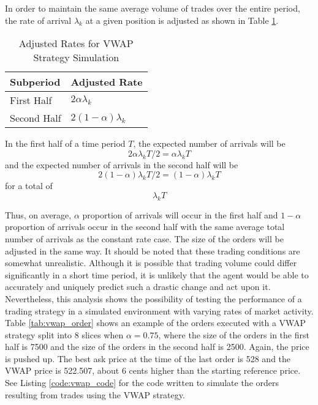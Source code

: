In order to maintain the same average volume of trades over the entire period, the rate of arrival $\lambda_k$ at a given position is adjusted as shown in Table \ref{tab:adjusted_rates}.

\begin{table}[htbp]
\caption{Adjusted Rates for VWAP Strategy Simulation} \label{tab:adjusted_rates}
\begin{center}
\begin{tabular}{l|l}
\textbf{Subperiod}            & \textbf{Adjusted Rate}             \\
\hline
First Half  & $2 \alpha \lambda_k $    \\
Second Half & $2 (1 - \alpha) \lambda_k$
\end{tabular}
\end{center}
\end{table}

In the first half of a time period $T$, the expected number of arrivals will be 
$$2 \alpha \lambda_k T / 2 = \alpha \lambda_k T$$ 
and the expected number of arrivals in the second half will be 
$$2 (1-\alpha) \lambda_k T / 2 = (1-\alpha) \lambda_k T$$
for a total of $$\lambda_k T$$

Thus, on average, $\alpha$ proportion of arrivals will occur in the first half and $1-\alpha$ proportion of arrivals occur in the second half with the same average total number of arrivals as the constant rate case. The size of the orders will be adjusted in the same way. It should be noted that these trading conditions are somewhat unrealistic. Although it is possible that trading volume could differ significantly in a short time period, it is unlikely that the agent would be able to accurately and uniquely predict such a drastic change and act upon it. Nevertheless, this analysis shows the possibility of testing the performance of a trading strategy in a simulated environment with varying rates of market activity. Table \ref{tab:vwap_order} shows an example of the orders executed with a VWAP strategy split into 8 slices when $\alpha = 0.75$, where the size of the orders in the first half is 7500 and the size of the orders in the second half is 2500. Again, the price is pushed up. The best ask price at the time of the last order is 528 and the VWAP price is 522.507, about 6 cents higher than the starting reference price. See Listing \ref{code:vwap_code} for the code written to simulate the orders resulting from trades using the VWAP strategy.

